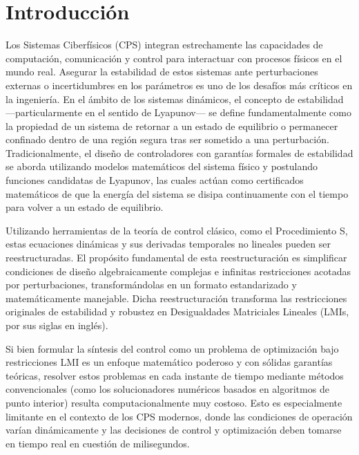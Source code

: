 \chapter{Introducción}
\label{sec:intro}

Los Sistemas Ciberfísicos (CPS) integran estrechamente las capacidades de computación, comunicación y control para interactuar con procesos físicos en el mundo real. Asegurar la estabilidad de estos sistemas ante perturbaciones externas o incertidumbres en los parámetros es uno de los desafíos más críticos en la ingeniería.  En el ámbito de los sistemas dinámicos, el concepto de estabilidad —particularmente en el sentido de Lyapunov— se define fundamentalmente como la propiedad de un sistema de retornar a un estado de equilibrio o permanecer confinado dentro de una región segura tras ser sometido a una perturbación. Tradicionalmente, el diseño de controladores con garantías formales de estabilidad se aborda utilizando modelos matemáticos del sistema físico y postulando funciones candidatas de Lyapunov, las cuales actúan como certificados matemáticos de que la energía del sistema se disipa continuamente con el tiempo para volver a un estado de equilibrio.

Utilizando herramientas de la teoría de control clásico, como el Procedimiento S, estas ecuaciones dinámicas y sus derivadas temporales no lineales pueden ser reestructuradas. El propósito fundamental de esta reestructuración es simplificar condiciones de diseño algebraicamente complejas e infinitas restricciones acotadas por perturbaciones, transformándolas en un formato estandarizado y matemáticamente manejable. Dicha reestructuración transforma las restricciones originales de estabilidad y robustez en Desigualdades Matriciales Lineales (LMIs, por sus siglas en inglés). 

Si bien formular la síntesis del control como un problema de optimización bajo restricciones LMI es un enfoque matemático poderoso y con sólidas garantías teóricas, resolver estos problemas en cada instante de tiempo mediante métodos convencionales (como los solucionadores numéricos basados en algoritmos de punto interior) resulta computacionalmente muy costoso. Esto es especialmente limitante en el contexto de los CPS modernos, donde las condiciones de operación varían dinámicamente y las decisiones de control y optimización deben tomarse en tiempo real en cuestión de milisegundos.

